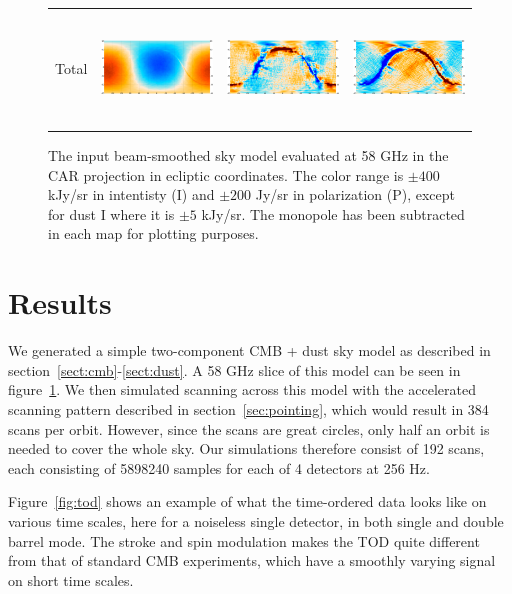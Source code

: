 \documentclass{article}
\begin{document}
\begin{figure}
\begin{tabular}{rm{56mm}m{54.4mm}m{56mm}}
		Total &
		\includegraphics[height=29.7mm,clip,trim=0 0mm 7.5mm 0]{plots/sim_freqmap_58GHz_0_0.png} &
		\includegraphics[height=29.7mm,clip,trim=7.5mm 0mm 7.5mm 0]{plots/sim_freqmap_58GHz_0_1.png} &
		\includegraphics[height=29.7mm,clip,trim=7.5mm 0mm 0 0]{plots/sim_freqmap_58GHz_0_2.png}
	\end{tabular}
	\caption{The input beam-smoothed sky model evaluated at 58 GHz in the CAR
	projection in ecliptic coordinates. The color range is
	$\pm 400$ kJy/sr in intentisty (I) and $\pm 200$ Jy/sr in polarization (P), except for dust I where it is
	$\pm 5$ kJy/sr. The monopole has been subtracted in each map for plotting purposes.}
	\label{fig:model}
\end{figure}

\section{Results}
\label{sect:results}
We generated a simple two-component CMB + dust sky model as described in
section~\ref{sect:cmb}-\ref{sect:dust}. A 58 GHz slice of this
model can be seen in figure~\ref{fig:model}. We then simulated
scanning across this model with the accelerated scanning pattern
described in section~\ref{sec:pointing}, which would result in 384
scans per orbit.
However, since the scans are great circles, only half an orbit
is needed to cover the whole sky. Our simulations therefore consist
of 192 scans, each consisting of 5898240 samples for each of 4
detectors at 256 Hz.

Figure~\ref{fig:tod} shows an example of what the time-ordered
data looks like on various time scales, here for a noiseless
single detector, in both single and double barrel mode. The
stroke and spin modulation makes the TOD quite different from
that of standard CMB experiments, which have a smoothly varying
signal on short time scales.
\end{document}
